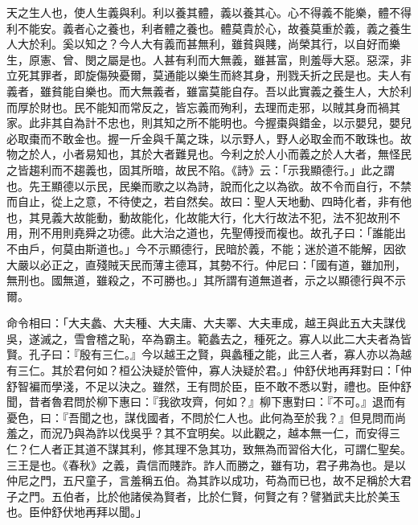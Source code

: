 天之生人也，使人生義與利。利以養其體，義以養其心。心不得義不能樂，體不得利不能安。義者心之養也，利者體之養也。體莫貴於心，故養莫重於義，義之養生人大於利。奚以知之？今人大有義而甚無利，雖貧與賤，尚榮其行，以自好而樂生，原憲、曾、閔之屬是也。人甚有利而大無義，雖甚富，則羞辱大惡。惡深，非立死其罪者，即旋傷殃憂爾，莫通能以樂生而終其身，刑戮夭折之民是也。夫人有義者，雖貧能自樂也。而大無義者，雖富莫能自存。吾以此實義之養生人，大於利而厚於財也。民不能知而常反之，皆忘義而殉利，去理而走邪，以賊其身而禍其家。此非其自為計不忠也，則其知之所不能明也。今握棗與錯金，以示嬰兒，嬰兒必取棗而不敢金也。握一斤金與千萬之珠，以示野人，野人必取金而不敢珠也。故物之於人，小者易知也，其於大者難見也。今利之於人小而義之於人大者，無怪民之皆趨利而不趨義也，固其所暗，故民不陷。《詩》云：「示我顯德行。」此之謂也。先王顯德以示民，民樂而歌之以為詩，說而化之以為欲。故不令而自行，不禁而自止，從上之意，不待使之，若自然矣。故曰：聖人天地動、四時化者，非有他也，其見義大故能動，動故能化，化故能大行，化大行故法不犯，法不犯故刑不用，刑不用則堯舜之功德。此大治之道也，先聖傅授而複也。故孔子曰：「誰能出不由戶，何莫由斯道也。」今不示顯德行，民暗於義，不能；迷於道不能解，因欲大嚴以必正之，直殘賊天民而薄主德耳，其勢不行。仲尼曰：「國有道，雖加刑，無刑也。國無道，雖殺之，不可勝也。」其所謂有道無道者，示之以顯德行與不示爾。


命令相曰：「大夫蠡、大夫種、大夫庸、大夫睪、大夫車成，越王與此五大夫謀伐吳，遂滅之，雪會稽之恥，卒為霸主。範蠡去之，種死之。寡人以此二大夫者為皆賢。孔子曰：『殷有三仁。』今以越王之賢，與蠡種之能，此三人者，寡人亦以為越有三仁。其於君何如？桓公決疑於管仲，寡人決疑於君。」仲舒伏地再拜對曰：「仲舒智褊而學淺，不足以決之。雖然，王有問於臣，臣不敢不悉以對，禮也。臣仲舒聞，昔者魯君問於柳下惠曰：『我欲攻齊，何如？』柳下惠對曰：『不可。』退而有憂色，曰：『吾聞之也，謀伐國者，不問於仁人也。此何為至於我？』但見問而尚羞之，而況乃與為詐以伐吳乎？其不宜明矣。以此觀之，越本無一仁，而安得三仁？仁人者正其道不謀其利，修其理不急其功，致無為而習俗大化，可謂仁聖矣。三王是也。《春秋》之義，貴信而賤詐。詐人而勝之，雖有功，君子弗為也。是以仲尼之門，五尺童子，言羞稱五伯。為其詐以成功，苟為而已也，故不足稱於大君子之門。五伯者，比於他諸侯為賢者，比於仁賢，何賢之有？譬猶武夫比於美玉也。臣仲舒伏地再拜以聞。」


